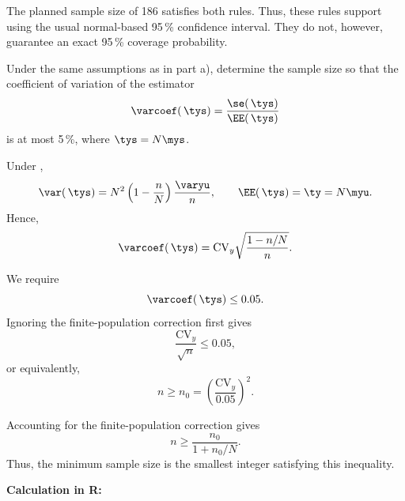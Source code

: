 \begin{Problem}
\begin{Subtask}
\begin{Solution}
        The planned sample size of 186 satisfies both rules.
        Thus, these rules support using the usual normal-based 95\,\% confidence
        interval. They do not, however, guarantee an exact 95\,\% coverage
        probability.
    \end{Solution}

    \item Under the same assumptions as in part a), determine the sample size so
        that the coefficient of variation of the estimator
        \begin{equation*}
            \varcoef(\,\tys) = \frac{\se(\,\tys)}{\EE(\,\tys)}
        \end{equation*}
        is at most 5\,\%, where $\tys = N \mys$.

    \begin{Solution}
        Under \SRS,
        \begin{equation*}
            \var(\,\tys) = N^2\left(1-\frac{n}{N}\right)\frac{\varyu}{n},
            \qquad \EE(\,\tys)=\ty=N\myu.
        \end{equation*}
        Hence,
        \begin{equation*}
            \varcoef(\,\tys) = \mathrm{CV}_y \sqrt{\frac{1-n/N}{n}}.
        \end{equation*}

        We require
        \begin{equation*}
            \varcoef(\,\tys) \leq 0.05.
        \end{equation*}
        Ignoring the finite-population correction first gives
        \begin{equation*}
            \frac{\mathrm{CV}_y}{\sqrt{n}} \leq 0.05,
        \end{equation*}
        or equivalently,
        \begin{equation*}
            n \geq n_0 = \left(\frac{\mathrm{CV}_y}{0.05}\right)^2.
        \end{equation*}

        Accounting for the finite-population correction gives
        \begin{equation*}
            n \geq \frac{n_0}{1+n_0/N}.
        \end{equation*}
        Thus, the minimum sample size is the smallest integer satisfying this
        inequality.

        \textbf{Calculation in R:}


\end{Solution}
\end{Subtask}
\end{Problem}
